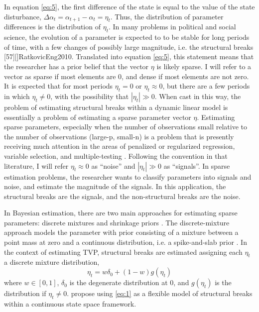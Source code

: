 \documentclass{article}
\begin{document}
In equation \eqref{eq:5}, the first difference of the state is equal to the value of the state disturbance, $\Delta \alpha_{t} = \alpha_{t+1} - \alpha_{t} = \eta_{t}$.
Thus, the distribution of parameter differences is the distribution of $\eta_{t}$.
In many problems in political and social science, the evolution of a parameter is expected to to be stable for long periods of time, with a few changes of possibly large magnitude, i.e. the structural breaks \parencite{Pierson2004}[57][]{RatkovicEng2010}.
Translated into equation \eqref{eq:5}, this statement means that the researcher has a prior belief that the vector $\eta$ is likely sparse.
I will refer to a vector as sparse if most elements are 0, and dense if most elements are not zero.
It is expected that for most periods $\eta_{t} = 0$ or $\eta_{t} \approx 0$, but there are a few periods in which $\eta_{t} \neq 0$, with the possibility that $|\eta_{t}| \gg 0$.
When cast in this way, the problem of estimating structural breaks within a dynamic linear model is essentially a problem of estimating a sparse parameter vector $\eta$.
Estimating sparse parameters, especially when the number of observations small relative to the number of observations (large-p, small-n) is a problem that is presently receiving much attention in the areas of penalized or regularized regression, variable selection, and multiple-testing \parencite{CarvalhoPolsonScott2010}.
Following the convention in that literature, I will refer $\eta_{t} \approx 0$ as ``noise'' and $|\eta_{t}| \gg 0$ as ``signals''.
In sparse estimation problems, the researcher wants to classify parameters into signals and noise, and estimate the magnitude of the signals.
In this application, the structural breaks are the signals, and the non-structural breaks are the noise.

In Bayesian estimation, there are two main approaches for estimating sparse parameters: discrete mixtures and shrinkage priors \parencite[73]{CarvalhoPolsonScott2009}.
The discrete-mixture approach models the parameter with prior consisting of a mixture between a point mass at zero and a continuous distribution, i.e. a spike-and-slab prior \parencite{GeorgeMcCulloch1993}.
In the context of estimating TVP, structural breaks are estimated assigning each $\eta_{t}$ a discrete mixture distribution,
\begin{equation}
  \label{eq:1}
  \eta_{t} = w \delta_{0} +  (1 - w) g(\eta_{t})
\end{equation}
where $w \in [0, 1]$, $\delta_{0}$ is the degenerate distribution at 0, and $g(\eta_{t})$ is the distribution if $\eta_{t} \neq 0$.
\textcite{GiordaniKohn2008} propose using \eqref{eq:1} as a flexible model of structural breaks within a continuous state space framework.
\end{document}
